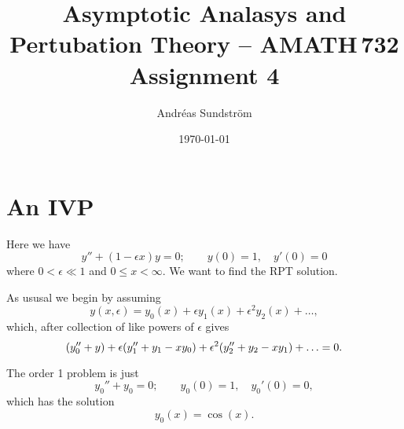 \documentclass[11pt,letter, swedish, english
]{article}
\begin{document}
\title{Asymptotic Analasys and Pertubation Theory -- AMATH\,732 \\
Assignment 4}
\author{Andréas Sundström}
\date{\today}

\maketitle



\section{An IVP}
Here we have
\begin{equation}\label{eq:1_IVP}
y''+(1-\epsilon x)y=0;\qquad
y(0)=1,\quad y'(0)=0
\end{equation}
where $0<\epsilon\ll1$ and $0\le x<\infty$. We want to find the RPT
solution. 

As ususal we begin by assuming
\begin{equation}
y(x, \epsilon)=y_0(x) + \epsilon y_1(x) + \epsilon^2 y_2(x)+\ldots,
\end{equation}
which, after collection of like powers of $\epsilon$ gives
\begin{equation}
\qty(y_0''+y) +\epsilon\qty(y_1''+y_1-xy_0) 
+\epsilon^2\qty(y_2''+y_2-xy_1) +\ldots=0.
\end{equation}

The order 1 problem is just
\begin{equation}
y_0''+y_0=0;\qquad
y_0(0)=1,\quad y_0'(0)=0,
\end{equation}
which has the solution
\begin{equation}
y_0(x)=\cos(x).
\end{equation}
\end{document}
